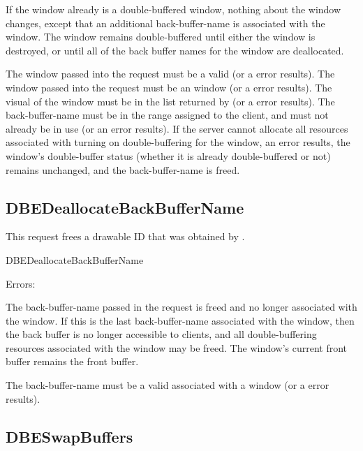 If the window already is a double-buffered window, nothing about the
window changes, except that an additional back-buffer-name
is associated with the window.  The window remains double-buffered
until either the window is destroyed, or until all of the back buffer
names for the window are deallocated.

The window passed into the request must be a valid 
(or a  error results).
The window passed into the request must
be an  window (or a  error results).
The visual of the window must be in the list returned by
 (or a  error results).
The back-buffer-name must be in the range assigned to the
client, and must not already be in use (or an 
error results).
If the server cannot allocate all resources associated with turning on
double-buffering for the window, an  error results, the
window's double-buffer status (whether it is already double-buffered or not)
remains unchanged, and the back-buffer-name is freed.

\subsection{DBEDeallocateBackBufferName}

This request frees a drawable ID that was obtained by
.

\begin{arequest}{DBEDeallocateBackBufferName}
\end{arequest}

Errors: 

The back-buffer-name passed in the request is freed and no
longer associated with the window.  If this is the last
back-buffer-name associated with the window, then the back
buffer is no longer accessible to clients, and all double-buffering
resources associated with the window may be freed.  The window's
current front buffer remains the front buffer.

The back-buffer-name must be a valid 
associated with a window (or a  error results).

\subsection{DBESwapBuffers}

